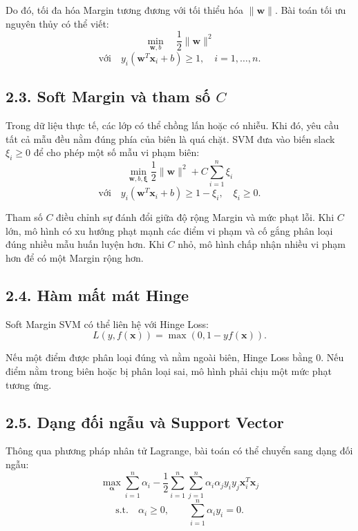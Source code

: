 \documentclass{article}
\begin{document}
	Do đó, tối đa hóa Margin tương đương với tối thiểu hóa $\|\mathbf{w}\|$. Bài toán tối ưu nguyên thủy có thể viết:
	\begin{equation}
		\min_{\mathbf{w},b}\quad \frac{1}{2}\|\mathbf{w}\|^2
	\end{equation}
	\begin{equation}
		\text{với}\quad y_i(\mathbf{w}^{T}\mathbf{x}_i+b)\geq1,\quad i=1,\ldots,n.
	\end{equation}
	
	\subsection{2.3. Soft Margin và tham số $C$}
	\hspace{0.5cm}
	Trong dữ liệu thực tế, các lớp có thể chồng lấn hoặc có nhiễu. Khi đó, yêu cầu tất cả mẫu đều nằm đúng phía của biên là quá chặt. SVM đưa vào biến slack $\xi_i\geq0$ để cho phép một số mẫu vi phạm biên:
	\begin{equation}
		\min_{\mathbf{w},b,\boldsymbol{\xi}}
		\frac{1}{2}\|\mathbf{w}\|^2+C\sum_{i=1}^{n}\xi_i
	\end{equation}
	\begin{equation}
		\text{với}\quad y_i(\mathbf{w}^{T}\mathbf{x}_i+b)\geq1-\xi_i,\quad \xi_i\geq0.
	\end{equation}
	
	Tham số $C$ điều chỉnh sự đánh đổi giữa độ rộng Margin và mức phạt lỗi. Khi $C$ lớn, mô hình có xu hướng phạt mạnh các điểm vi phạm và cố gắng phân loại đúng nhiều mẫu huấn luyện hơn. Khi $C$ nhỏ, mô hình chấp nhận nhiều vi phạm hơn để có một Margin rộng hơn.
	
	\subsection{2.4. Hàm mất mát Hinge}
	\hspace{0.5cm}
	Soft Margin SVM có thể liên hệ với Hinge Loss:
	\begin{equation}
		L(y,f(\mathbf{x}))=\max(0,1-yf(\mathbf{x})).
	\end{equation}
	
	Nếu một điểm được phân loại đúng và nằm ngoài biên, Hinge Loss bằng 0. Nếu điểm nằm trong biên hoặc bị phân loại sai, mô hình phải chịu một mức phạt tương ứng.
	
	\subsection{2.5. Dạng đối ngẫu và Support Vector}
	\hspace{0.5cm}
	Thông qua phương pháp nhân tử Lagrange, bài toán có thể chuyển sang dạng đối ngẫu:
	\begin{equation}
		\max_{\boldsymbol{\alpha}}
		\sum_{i=1}^{n}\alpha_i
		-\frac{1}{2}\sum_{i=1}^{n}\sum_{j=1}^{n}
		\alpha_i\alpha_jy_iy_j\mathbf{x}_i^{T}\mathbf{x}_j
	\end{equation}
	\begin{equation}
		\text{s.t.}\quad
		\alpha_i\geq0,
		\qquad
		\sum_{i=1}^{n}\alpha_i y_i=0.
	\end{equation}
	
\end{document}
